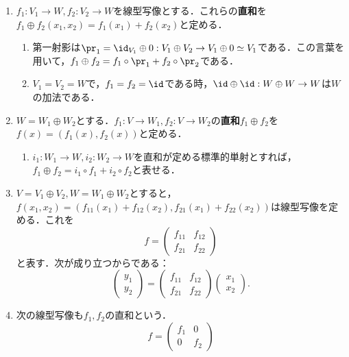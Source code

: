 \documentclass[uplatex, dvipdfmx]{jsreport}
\begin{document}
\begin{definition}[線型写像の直和]\mbox{}
    \begin{enumerate}
        \item $f_1:V_1\to W,f_2:V_2\to W$を線型写像とする．これらの\textbf{直和}を$f_1\oplus f_2(x_1,x_2)=f_1(x_1)+f_2(x_2)$と定める．
        \begin{enumerate}[(1)]
            \item 第一射影は$\pr_1=\id_{V_1}\oplus 0:V_1\oplus V_2\to V_1\oplus 0\simeq V_1$である．この言葉を用いて，$f_1\oplus f_2=f_1\circ\pr_1+f_2\circ\pr_2$である．
            \item $V_1=V_2=W$で，$f_1=f_2=\id$である時，$\id\oplus\id:W\oplus W\to W$は$W$の加法である．
        \end{enumerate}
        \item $W=W_1\oplus W_2$とする．$f_1:V\to W_1,f_2:V\to W_2$の\textbf{直和}$f_1\oplus f_2$を$f(x)=(f_1(x),f_2(x))$と定める．
        \begin{enumerate}[(1)]
            \item $i_1:W_1\to W,i_2:W_2\to W$を直和が定める標準的単射とすれば，$f_1\oplus f_2=i_1\circ f_1+i_2\circ f_2$と表せる．
        \end{enumerate}
        \item $V=V_1\oplus V_2,W=W_1\oplus W_2$とすると，$f(x_1,x_2)=(f_{11}(x_1)+f_{12}(x_2),f_{21}(x_1)+f_{22}(x_2))$は線型写像を定める．これを
        \[ f=\begin{pmatrix}f_{11}&f_{12}\\f_{21}&f_{22}\end{pmatrix} \]
        と表す．次が成り立つからである：
        \[ \begin{pmatrix}y_1\\y_2\end{pmatrix}=\begin{pmatrix}f_{11}&f_{12}\\f_{21}&f_{22}\end{pmatrix}\begin{pmatrix}x_1\\x_2\end{pmatrix}. \]
        \item 次の線型写像も$f_1,f_2$の直和という．
        \[ f=\begin{pmatrix}f_{1}&0\\0&f_{2}\end{pmatrix} \]
    \end{enumerate}
\end{definition}
\end{document}
